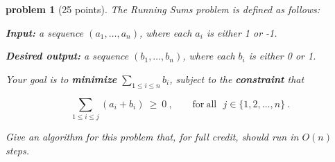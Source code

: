 \documentclass[10pt]{article}
\newtheorem{problem}{\sc\color{cit}problem}
\begin{document}
\newpage
\begin{problem}[25 points]
The Running Sums problem is defined as follows:

\vspace{1 em}


\textbf{Input:} a sequence $(a_1, \ldots, a_n)$, where each $a_i$ is either 1 or -1.  

\vspace{1 em}

\textbf{Desired output:} a sequence $(b_1, \ldots, b_n)$, where each $b_i$ is either 0 or 1.  

Your goal is to \textbf{minimize} $\sum_{1 \leq i \leq n} b_i$, subject to the \textbf{constraint} that

\[    \sum_{1 \leq i \leq j} (a_i + b_i) \ \geq \ 0 \ ,   \ \ \ \ \ \ \ \ \   \mathrm{for \ all \ \ \ }j \in \{1, 2, \ldots, n\} \ .  \]

Give an algorithm for this problem that, for full credit, should run in $O(n)$ steps.



\end{problem}
\end{document}
